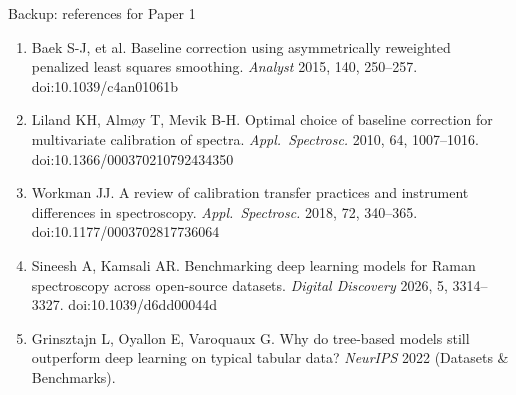 \documentclass[aspectratio=169,10pt]{beamer}
\begin{document}
\begin{frame}{Backup: references for Paper 1}
\begin{enumerate}
  \item Baek S-J, et al. Baseline correction using asymmetrically reweighted penalized least squares smoothing. \emph{Analyst} 2015, 140, 250--257. doi:10.1039/c4an01061b
  \item Liland KH, Alm\o y T, Mevik B-H. Optimal choice of baseline correction for multivariate calibration of spectra. \emph{Appl.\ Spectrosc.} 2010, 64, 1007--1016. doi:10.1366/000370210792434350
  \item Workman JJ. A review of calibration transfer practices and instrument differences in spectroscopy. \emph{Appl.\ Spectrosc.} 2018, 72, 340--365. doi:10.1177/0003702817736064
  \item Sineesh A, Kamsali AR. Benchmarking deep learning models for Raman spectroscopy across open-source datasets. \emph{Digital Discovery} 2026, 5, 3314--3327. doi:10.1039/d6dd00044d
  \item Grinsztajn L, Oyallon E, Varoquaux G. Why do tree-based models still outperform deep learning on typical tabular data? \emph{NeurIPS} 2022 (Datasets \& Benchmarks).
\end{enumerate}
\end{frame}
\end{document}
